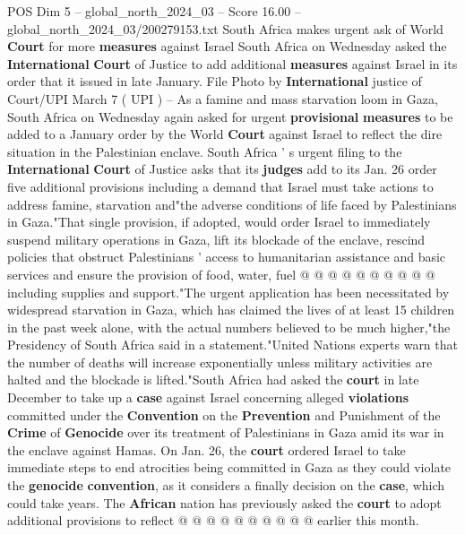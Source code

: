 \begin{textsample}{POS Dim 5 – global\_north\_2024\_03 – Score 16.00 – global\_north\_2024\_03/200279153.txt}  \label{ex:f5_pos_292}
South Africa makes urgent ask of World \textbf{Court} for more \textbf{measures} against Israel South Africa on Wednesday asked the \textbf{International} \textbf{Court} of Justice to add additional \textbf{measures} against Israel in its order that it issued in late January.
File Photo by \textbf{International} justice of Court/UPI March 7 ( UPI ) -- As a famine and mass starvation loom in Gaza, South Africa on Wednesday again asked for urgent \textbf{provisional} \textbf{measures} to be added to a January order by the World \textbf{Court} against Israel to reflect the dire situation in the Palestinian enclave.
South Africa ' s urgent filing to the \textbf{International} \textbf{Court} of Justice asks that its \textbf{judges} add to its Jan. 26 order five additional provisions including a demand that Israel must take actions to address famine, starvation and"the adverse conditions of life faced by Palestinians in Gaza."That single provision, if adopted, would order Israel to immediately suspend military operations in Gaza, lift its blockade of the enclave, rescind policies that obstruct Palestinians ' access to humanitarian assistance and basic services and ensure the provision of food, water, fuel @ @ @ @ @ @ @ @ @ @ including supplies and support."The urgent application has been necessitated by widespread starvation in Gaza, which has claimed the lives of at least 15 children in the past week alone, with the actual numbers believed to be much higher,"the Presidency of South Africa said in a statement."United Nations experts warn that the number of deaths will increase exponentially unless military activities are halted and the blockade is lifted."South Africa had asked the \textbf{court} in late December to take up a \textbf{case} against Israel concerning alleged \textbf{violations} committed under the \textbf{Convention} on the \textbf{Prevention} and Punishment of the \textbf{Crime} of \textbf{Genocide} over its treatment of Palestinians in Gaza amid its war in the enclave against Hamas.
On Jan. 26, the \textbf{court} ordered Israel to take immediate steps to end atrocities being committed in Gaza as they could violate the \textbf{genocide} \textbf{convention}, as it considers a finally decision on the \textbf{case}, which could take years.
The \textbf{African} nation has previously asked the \textbf{court} to adopt additional provisions to reflect @ @ @ @ @ @ @ @ @ @ earlier this month.

\end{textsample}

